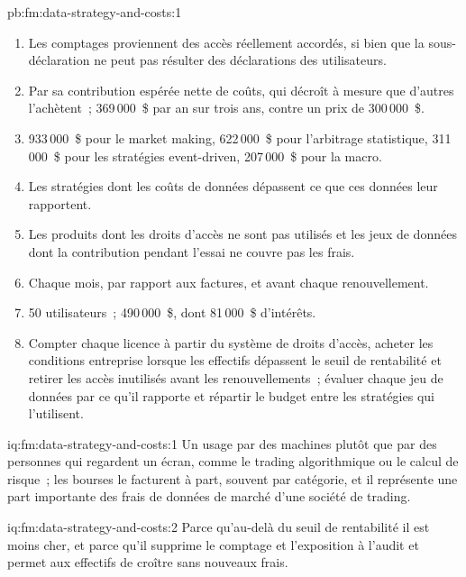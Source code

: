 \begin{solution}{pb:fm:data-strategy-and-costs:1}
\begin{enumerate}
comptage.
\item Les comptages proviennent des accès réellement accordés, si bien que la sous-déclaration ne peut pas résulter des déclarations des utilisateurs.
\item Par sa contribution espérée nette de coûts, qui décroît à mesure que d'autres l'achètent~; 369\,000~\$ par an sur trois ans, contre un prix de 300\,000~\$.
\item 933\,000~\$ pour le market making, 622\,000~\$ pour l'arbitrage statistique, 311\,000~\$ pour les stratégies event-driven, 207\,000~\$ pour la macro.
\item Les stratégies dont les coûts de données dépassent ce que ces données leur rapportent.
\item Les produits dont les droits d'accès ne sont pas utilisés et les jeux de données dont la contribution pendant l'essai ne couvre pas les frais.
\item Chaque mois, par rapport aux factures, et avant chaque renouvellement.
\item 50 utilisateurs~; 490\,000~\$, dont 81\,000~\$ d'intérêts.
\item Compter chaque licence à partir du système de droits d'accès, acheter les conditions entreprise lorsque les effectifs dépassent le seuil de rentabilité et retirer les accès inutilisés avant
les renouvellements~; évaluer chaque jeu de données par ce qu'il rapporte et répartir le budget entre les stratégies qui l'utilisent.
\end{enumerate}
\end{solution}

\begin{solution}{iq:fm:data-strategy-and-costs:1}
Un usage par des machines plutôt que par des personnes qui regardent un écran, comme le trading algorithmique ou le calcul de risque~; les bourses le facturent à part, souvent
par catégorie, et il représente une part importante des frais de données de marché d'une société de trading.
\end{solution}

\begin{solution}{iq:fm:data-strategy-and-costs:2}
Parce qu'au-delà du seuil de rentabilité il est moins cher, et parce qu'il supprime le comptage et l'exposition à l'audit et permet aux effectifs de croître sans nouveaux frais.
\end{solution}

